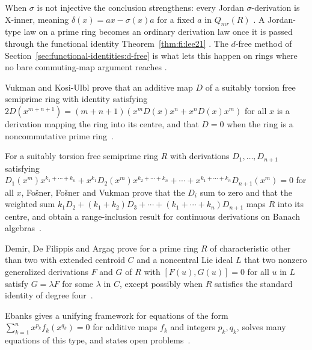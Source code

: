 When $\sigma$ is not injective the conclusion strengthens: every Jordan
$\sigma$-derivation is X-inner, meaning $\delta(x)=ax-\sigma(x)a$ for a
fixed $a$ in $Q_{mr}(R)$ \cite[Theorem~2.4, p.~221]{LeeTK2015JordanFI}.
A Jordan-type law on a prime ring becomes an ordinary derivation law once
it is passed through the functional identity Theorem~\ref{thm:fi:lee21}
\cite[p.~221]{LeeTK2015JordanFI}. The $d$-free method of
Section~\ref{sec:functional-identities:d-free} is what lets this happen on
rings where no bare commuting-map argument reaches
\cite[p.~x]{BresarMartindaleChebotar2007FI}.

Vukman and Kosi-Ulbl prove that an additive map $D$ of a suitably torsion free semiprime ring with identity satisfying $2D(x^{m+n+1})=(m+n+1)(x^mD(x)x^n+x^nD(x)x^m)$ for all $x$ is a derivation mapping the ring into its centre, and that $D=0$ when the ring is a noncommutative prime ring~\cite{WlOnSomeEquationsRelatedToDeriva2006}.

For a suitably torsion free semiprime ring $R$ with derivations $D_1,\dots,D_{n+1}$ satisfying $D_1(x^m)x^{k_1+\cdots+k_n}+x^{k_1}D_2(x^m)x^{k_2+\cdots+k_n}+\cdots+x^{k_1+\cdots+k_n}D_{n+1}(x^m)=0$ for all $x$, Fo\v{s}ner, Fo\v{s}ner and Vukman prove that the $D_i$ sum to zero and that the weighted sum $k_1D_2+(k_1+k_2)D_3+\cdots+(k_1+\cdots+k_n)D_{n+1}$ maps $R$ into its centre, and obtain a range-inclusion result for continuous derivations on Banach algebras~\cite{WlAnIdentityWithDerivationsOnRin2008}.

Demir, De Filippis and Arga\c{c} prove for a prime ring $R$ of characteristic other than two with extended centroid $C$ and a noncentral Lie ideal $L$ that two nonzero generalized derivations $F$ and $G$ of $R$ with $[F(u),G(u)]=0$ for all $u$ in $L$ satisfy $G=\lambda F$ for some $\lambda$ in $C$, except possibly when $R$ satisfies the standard identity of degree four~\cite{WlAQuadraticGeneralizedDifferent2020}.

Ebanks gives a unifying framework for equations of the form $\sum_{k=1}^{n}x^{p_k}f_k(x^{q_k})=0$ for additive maps $f_k$ and integers $p_k,q_k$, solves many equations of this type, and states open problems~\cite{WlCharacterizingRingDerivationsO2014}.
